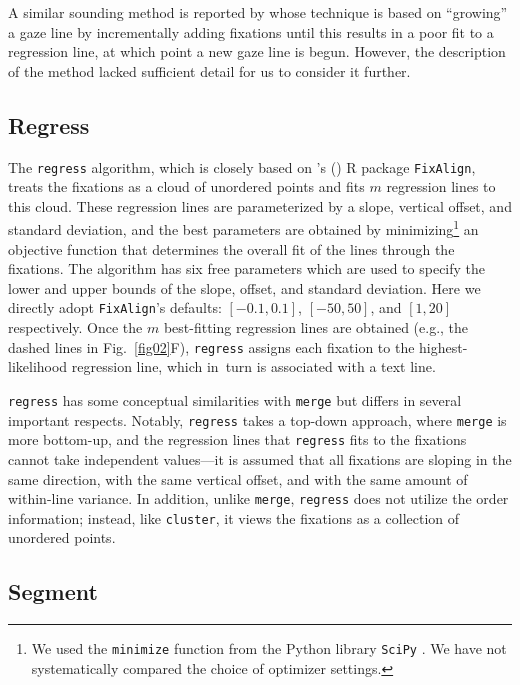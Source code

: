\documentclass[doc,biblatex]{apa7}
\newcommand\possessivecite[1]{\citeauthor{#1}'s (\citeyear{#1})} %
\begin{document}
A similar sounding method is reported by \textcite{Beymer:2005} whose technique is based on ``growing'' a gaze line by incrementally adding fixations until this results in a poor fit to a regression line, at which point a new gaze line is begun. However, the description of the method lacked sufficient detail for us to consider it further.

\subsection{Regress}

The \texttt{regress} algorithm, which is closely based on \possessivecite{Cohen:2013} R package \texttt{FixAlign}, treats the fixations as a cloud of unordered points and fits $m$ regression lines to this cloud. These regression lines are parameterized by a slope, vertical offset, and standard deviation, and the best parameters are obtained by minimizing\footnote{We used the \texttt{minimize} function from the Python library \texttt{SciPy} \parencite{Virtanen:2020}. We have not systematically compared the choice of optimizer settings.} an objective function that determines the overall fit of the lines through the fixations. The algorithm has six free parameters which are used to specify the lower and upper bounds of the slope, offset, and standard deviation. Here we directly adopt \texttt{FixAlign}'s defaults: $[-0.1, 0.1]$, $[-50, 50]$, and $[1, 20]$ respectively. Once the $m$ best-fitting regression lines are obtained (e.g., the dashed lines in Fig.~\ref{fig02}F), \texttt{regress} assigns each fixation to the highest-likelihood regression line, which in~turn is associated with a text line.

\texttt{regress} has some conceptual similarities with \texttt{merge} but differs in several important respects. Notably, \texttt{regress} takes a top-down approach, where \texttt{merge} is more bottom-up, and the regression lines that \texttt{regress} fits to the fixations cannot take independent values---it is assumed that all fixations are sloping in the same direction, with the same vertical offset, and with the same amount of within-line variance. In addition, unlike \texttt{merge}, \texttt{regress} does not utilize the order information; instead, like \texttt{cluster}, it views the fixations as a collection of unordered points.

\subsection{Segment}
\end{document}
